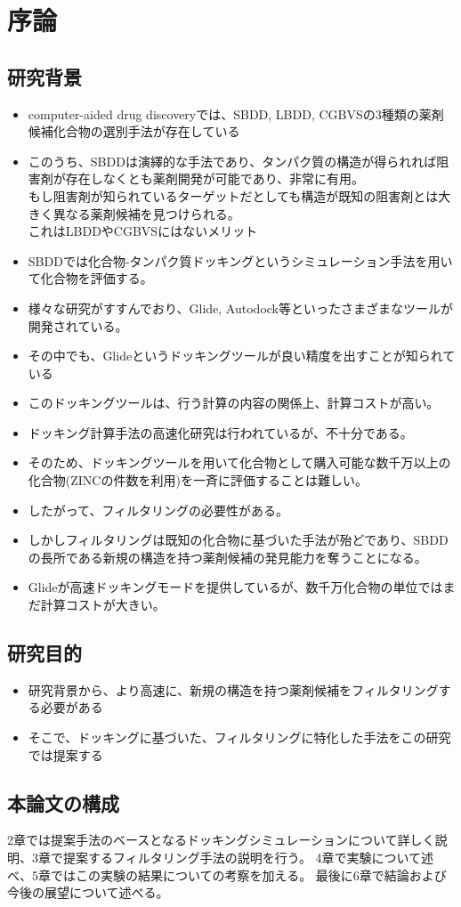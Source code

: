 \chapter{序論}
\section{研究背景}

\begin{itemize}
\item computer-aided drug discoveryでは、SBDD, LBDD, CGBVSの3種類の薬剤候補化合物の選別手法が存在している
\item このうち、SBDDは演繹的な手法であり、タンパク質の構造が得られれば阻害剤が存在しなくとも薬剤開発が可能であり、非常に有用。\\
	もし阻害剤が知られているターゲットだとしても構造が既知の阻害剤とは大きく異なる薬剤候補を見つけられる。\\
	これはLBDDやCGBVSにはないメリット\\
\item SBDDでは化合物-タンパク質ドッキングというシミュレーション手法を用いて化合物を評価する。
\item 様々な研究がすすんでおり、Glide, Autodock等といったさまざまなツールが開発されている。
\item その中でも、Glideというドッキングツールが良い精度を出すことが知られている
\item このドッキングツールは、行う計算の内容の関係上、計算コストが高い。
\item ドッキング計算手法の高速化研究は行われているが、不十分である。
\item そのため、ドッキングツールを用いて化合物として購入可能な数千万以上の化合物(ZINCの件数を利用)を一斉に評価することは難しい。
\item したがって、フィルタリングの必要性がある。
\item しかしフィルタリングは既知の化合物に基づいた手法が殆どであり、SBDDの長所である新規の構造を持つ薬剤候補の発見能力を奪うことになる。
\item Glideが高速ドッキングモードを提供しているが、数千万化合物の単位ではまだ計算コストが大きい。
\end{itemize}

\section{研究目的}
\begin{itemize}
\item 研究背景から、より高速に、新規の構造を持つ薬剤候補をフィルタリングする必要がある
\item そこで、ドッキングに基づいた、フィルタリングに特化した手法をこの研究では提案する
\end{itemize}

\section{本論文の構成}
2章では提案手法のベースとなるドッキングシミュレーションについて詳しく説明、3章で提案するフィルタリング手法の説明を行う。
4章で実験について述べ、5章ではこの実験の結果についての考察を加える。
最後に6章で結論および今後の展望について述べる。